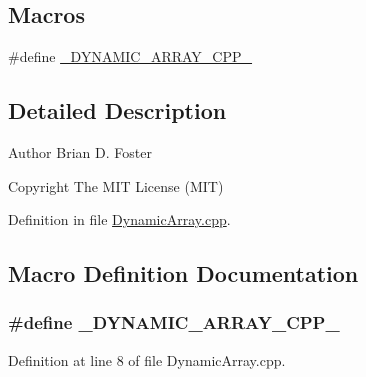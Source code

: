 \subsection*{Macros}
\begin{DoxyCompactItemize}
\item 
\#define \hyperlink{a00005_a2456e0218e200f6ae1142d51cbbc0941}{\+\_\+\+D\+Y\+N\+A\+M\+I\+C\+\_\+\+A\+R\+R\+A\+Y\+\_\+\+C\+P\+P\+\_\+}
\end{DoxyCompactItemize}


\subsection{Detailed Description}
\begin{DoxyAuthor}{Author}
Brian D. Foster 
\end{DoxyAuthor}
\begin{DoxyCopyright}{Copyright}
The M\+I\+T License (M\+I\+T) 
\end{DoxyCopyright}


Definition in file \hyperlink{a00005_source}{Dynamic\+Array.\+cpp}.



\subsection{Macro Definition Documentation}
\hypertarget{a00005_a2456e0218e200f6ae1142d51cbbc0941}{
\subsubsection[{\+\_\+\+D\+Y\+N\+A\+M\+I\+C\+\_\+\+A\+R\+R\+A\+Y\+\_\+\+C\+P\+P\+\_\+}]{\setlength{\rightskip}{0pt plus 5cm}\#define \+\_\+\+D\+Y\+N\+A\+M\+I\+C\+\_\+\+A\+R\+R\+A\+Y\+\_\+\+C\+P\+P\+\_\+}}\label{a00005_a2456e0218e200f6ae1142d51cbbc0941}


Definition at line 8 of file Dynamic\+Array.\+cpp.

